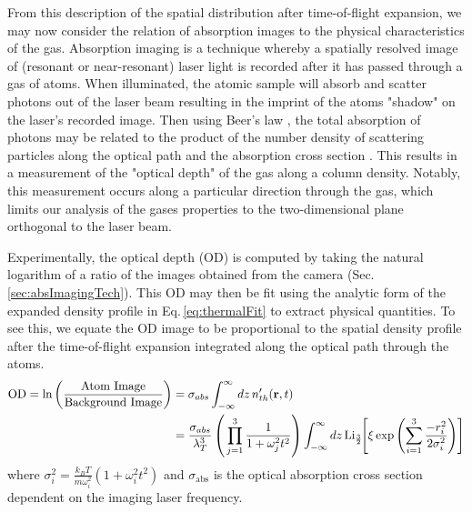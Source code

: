 From this description of the spatial distribution after time-of-flight expansion, we may now consider the relation of absorption images to the physical characteristics of the gas.
Absorption imaging is a technique whereby a spatially resolved image of (resonant or near-resonant) laser light is recorded after it has passed through a gas of atoms.
When illuminated, the atomic sample will absorb and scatter photons out of the laser beam resulting in the imprint of the atoms "shadow" on the laser's recorded image.
Then using Beer's law \cite{Foot2005, Hueck2017, Reinaudi2007}, the total absorption of photons may be related to the product of the number density of scattering particles along the optical path and the absorption cross section \cite{Mickelson2010b}. 
This results in a measurement of the "optical depth" of the gas along a column density. 
Notably, this measurement occurs along a particular direction through the gas, which limits our analysis of the gases properties to the two-dimensional plane orthogonal to the laser beam.

Experimentally, the optical depth (OD) is computed by taking the natural logarithm of a ratio of the images obtained from the camera (Sec.\,\ref{sec:absImagingTech}).
This OD may then be fit using the analytic form of the expanded density profile in Eq.\,\ref{eq:thermalFit} to extract physical quantities.
To see this, we equate the OD image to be proportional to the spatial density profile after the time-of-flight expansion integrated along the optical path through the atoms.
\begin{equation} \label{eq:polyLogExp}
\begin{split}
	\text{OD} = \text{ln} \left( \frac{\text{Atom Image}}{\text{Background Image}} \right) &= \sigma_{abs} \int_{-\infty}^{\infty} dz \, n_{th}'(\mathbf{r},t) \\ 
&= \frac{\sigma_{abs}}{\lambda_T^3} \left( \, \prod_{j=1}^3 \frac{1}{1+\omega_j^2t^2}\right) \int_{-\infty}^{\infty} dz\,\text{Li}_{\scriptscriptstyle\frac{3}{2}\!}\!\left[ \xi \,\text{exp}\left( {\sum_{i=1}^3 \frac{-r_i^2}{2\sigma_i^2}} \right) \right]
\end{split}
\end{equation}
where $\sigma_i^2 = \frac{k_BT}{m\omega_i^2}(1+\omega_i^2t^2)$ and $\sigma_{\text{abs}}$ is the optical absorption cross section dependent on the imaging laser frequency.

